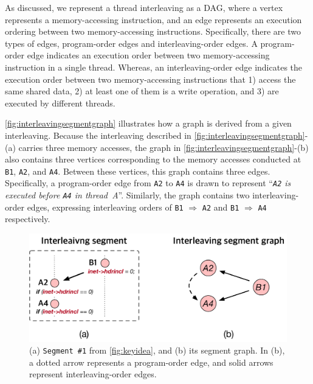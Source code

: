 %




As discussed,
we represent a thread interleaving as a DAG, where
%
a vertex represents a memory-accessing instruction, and an edge
represents an execution ordering between two memory-accessing
instructions.  Specifically, there are two types of edges,
program-order edges and interleaving-order edges.
%
A program-order edge indicates an execution order between two
memory-accessing instruction in a single thread.  Whereas, an
interleaving-order edge indicates the execution order between two
memory-accessing instructions that 1) access the same shared data, 2)
at least one of them is a write operation, and 3) are executed by
different threads.

\autoref{fig:interleavingsegmentgraph} illustrates how a graph is
derived from a given interleaving.
%
Because the interleaving described in
\autoref{fig:interleavingsegmentgraph}-(a) carries three memory
accesses, the graph in \autoref{fig:interleavingsegmentgraph}-(b) also
contains three vertices corresponding to the memory accesses conducted
at \texttt{B1}, \texttt{A2}, and \texttt{A4}.
%
Between these vertices, this graph contains three edges. Specifically,
a program-order edge from \texttt{A2} to \texttt{A4} is drawn to
represent ``\textit{\texttt{A2} is executed before \texttt{A4} in
  thread~A}''.
%
Similarly, the graph contains two interleaving-order edges, expressing
interleaving orders of \texttt{B1} $\Rightarrow$ \texttt{A2} and
\texttt{B1} $\Rightarrow$ \texttt{A4} respectively.



\begin{figure}[t]
  \centering
  \includegraphics[width=0.8\linewidth]{fig/interleavingsegmentgraph.pdf}
  \caption{(a) \texttt{Segment \#1} from \autoref{fig:keyidea}, and
    (b) its segment graph. In (b), a dotted arrow represents a
    program-order edge, and solid arrows represent interleaving-order
    edges.}
  \label{fig:interleavingsegmentgraph}
\end{figure}

